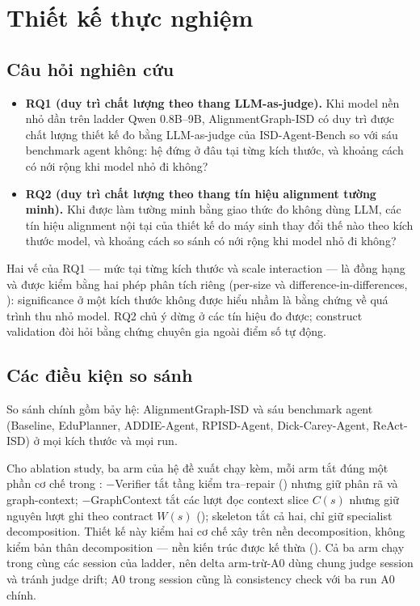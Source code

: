 \section{Thiết kế thực nghiệm}
\label{sec:experimental-methodology}

\subsection{Câu hỏi nghiên cứu}
\label{sec:rqs}

\begin{itemize}
  \item \textbf{RQ1 (duy trì chất lượng theo thang LLM-as-judge).} Khi model nền
  nhỏ dần trên ladder Qwen 0.8B--9B, AlignmentGraph-ISD có duy trì được chất lượng
  thiết kế đo bằng LLM-as-judge của ISD-Agent-Bench so với sáu benchmark agent
  không: hệ đứng ở đâu tại từng kích thước, và khoảng cách có nới rộng khi model
  nhỏ đi không?
  \item \textbf{RQ2 (duy trì chất lượng theo thang tín hiệu alignment tường
  minh).} Khi được làm tường minh bằng giao thức đo không dùng LLM, các tín hiệu
  alignment nội tại của thiết kế do máy sinh thay đổi thế nào theo kích thước
  model, và khoảng cách so sánh có nới rộng khi model nhỏ đi không?
\end{itemize}
Hai vế của RQ1 --- mức tại từng kích thước và scale interaction --- là đồng hạng
và được kiểm bằng hai phép phân tích riêng (per-size và
difference-in-differences, ): significance ở một kích thước không
được hiểu nhầm là bằng chứng về quá trình thu nhỏ model. RQ2 chủ ý dừng ở các tín
hiệu đo được; construct validation đòi hỏi bằng chứng chuyên gia ngoài điểm số tự
động.

\subsection{Các điều kiện so sánh}
\label{sec:conditions}

So sánh chính gồm bảy hệ: AlignmentGraph-ISD và sáu benchmark agent (Baseline,
EduPlanner, ADDIE-Agent, RPISD-Agent, Dick-Carey-Agent, ReAct-ISD) ở mọi kích
thước và mọi run.

Cho ablation study, ba arm của hệ đề xuất chạy kèm, mỗi arm tắt đúng một phần cơ
chế trong : $-$Verifier tắt tầng kiểm tra--repair
() nhưng giữ phân rã và graph-context; $-$GraphContext tắt các lượt
đọc context slice $C(s)$ nhưng giữ nguyên lượt ghi theo contract $W(s)$
(); skeleton tắt cả hai, chỉ giữ specialist
decomposition. Thiết kế này kiểm hai cơ chế xây trên nền decomposition, không
kiểm bản thân decomposition --- nền kiến trúc được kế thừa
(). Cả ba arm chạy trong cùng các session của ladder, nên
delta arm-trừ-A0 dùng chung judge session và tránh judge drift; A0 trong session
cũng là consistency check với ba run A0 chính.

